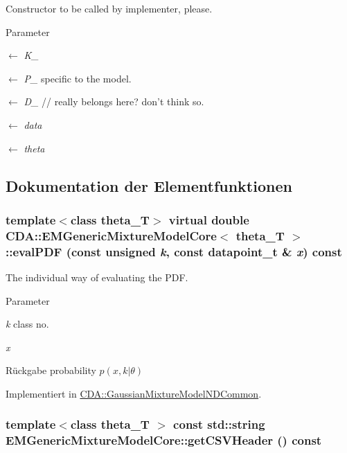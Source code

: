 Constructor to be called by implementer, please. 


\begin{DoxyParams}{Parameter}
\item[\mbox{$\leftarrow$} {\em K\_\-}]\item[\mbox{$\leftarrow$} {\em P\_\-}]specific to the model. \item[\mbox{$\leftarrow$} {\em D\_\-}]// really belongs here? don't think so. \item[\mbox{$\leftarrow$} {\em data}]\item[\mbox{$\leftarrow$} {\em theta}]\end{DoxyParams}


\subsection{Dokumentation der Elementfunktionen}
\hypertarget{classCDA_1_1EMGenericMixtureModelCore_ad8722983ea6f58d6e0b4a6bd117b050a}{
\subsubsection[{evalPDF}]{\setlength{\rightskip}{0pt plus 5cm}template$<$class theta\_\-T$>$ virtual double {\bf CDA::EMGenericMixtureModelCore}$<$ theta\_\-T $>$::evalPDF (const unsigned {\em k}, \/  const datapoint\_\-t \& {\em x}) const}}
\label{classCDA_1_1EMGenericMixtureModelCore_ad8722983ea6f58d6e0b4a6bd117b050a}


The individual way of evaluating the PDF. 


\begin{DoxyParams}{Parameter}
\item[{\em k}]class no. \item[{\em x}]\end{DoxyParams}
\begin{DoxyReturn}{Rückgabe}
probability $p(x,k\vert\theta)$ 
\end{DoxyReturn}


Implementiert in \hyperlink{classCDA_1_1GaussianMixtureModelNDCommon_aeac07962bd15c826561c68af7ac9c6d1}{CDA::GaussianMixtureModelNDCommon}.

\hypertarget{classCDA_1_1EMGenericMixtureModelCore_a10bd69fd4b420a274aee5f10e09ed5fe}{
\subsubsection[{getCSVHeader}]{\setlength{\rightskip}{0pt plus 5cm}template$<$class theta\_\-T $>$ const std::string EMGenericMixtureModelCore::getCSVHeader () const}}
\label{classCDA_1_1EMGenericMixtureModelCore_a10bd69fd4b420a274aee5f10e09ed5fe}


